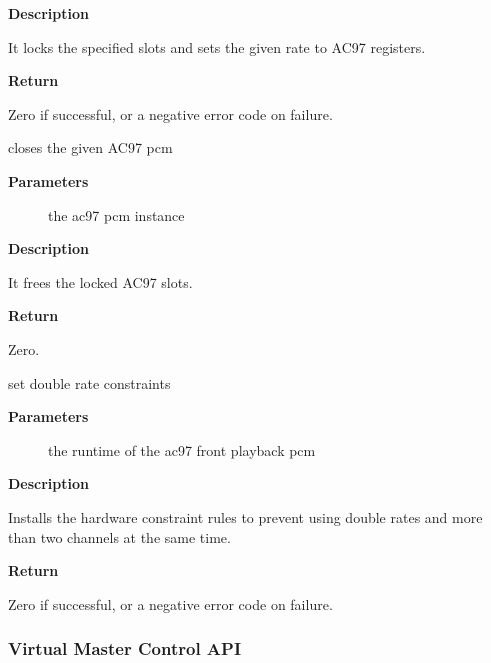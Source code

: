 \documentclass[a4paper,8pt,english]{sphinxmanual}
\begin{document}
\textbf{Description}

It locks the specified slots and sets the given rate to AC97 registers.

\textbf{Return}

Zero if successful, or a negative error code on failure.

\begin{fulllineitems}
\label{sound/kernel-api/alsa-driver-api:c.snd_ac97_pcm_close}
closes the given AC97 pcm

\end{fulllineitems}


\textbf{Parameters}
\begin{description}
\item[{}] \leavevmode
the ac97 pcm instance

\end{description}

\textbf{Description}

It frees the locked AC97 slots.

\textbf{Return}

Zero.

\begin{fulllineitems}
\label{sound/kernel-api/alsa-driver-api:c.snd_ac97_pcm_double_rate_rules}
set double rate constraints

\end{fulllineitems}


\textbf{Parameters}
\begin{description}
\item[{}] \leavevmode
the runtime of the ac97 front playback pcm

\end{description}

\textbf{Description}

Installs the hardware constraint rules to prevent using double rates and
more than two channels at the same time.

\textbf{Return}

Zero if successful, or a negative error code on failure.


\subsubsection{Virtual Master Control API}
\label{sound/kernel-api/alsa-driver-api:virtual-master-control-api}
\end{document}
